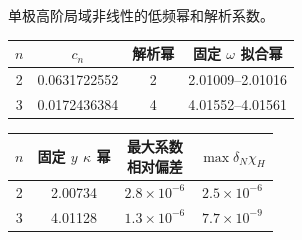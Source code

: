 \documentclass[UTF8,fontset=fandol,12pt,a4paper,oneside,openany]{ctexrep}
\begin{document}
\noindent\begin{minipage}{\linewidth}
\captionsetup{type=table}\caption{单极高阶局域非线性的低频幂和解析系数。}\label{audit:tab:power-l0}
\centering\fontsize{10.5}{14}\selectfont
\setlength{\tabcolsep}{6pt}\renewcommand{\arraystretch}{1.2}
\par{}\par\smallskip
\begin{tabular}{cccc}\toprule
$n$ & $c_n$ & 解析幂 & \shortstack{固定 $\omega$\\拟合幂}\\\midrule
2 & 0.0631722552 & 2 & 2.01009--2.01016\\
3 & 0.0172436384 & 4 & 4.01552--4.01561\\
\bottomrule\end{tabular}
\par\medskip
\par{}\par\smallskip
\begin{tabular}{cccc}\toprule
$n$ & \shortstack{固定 $y$\\$\kappa$ 幂} & \shortstack{最大系数\\相对偏差} & $\max\delta_N\chi_H$\\\midrule
2 & 2.00734 & $2.8\times10^{-6}$ & $2.5\times10^{-6}$\\
3 & 4.01128 & $1.3\times10^{-6}$ & $7.7\times10^{-9}$\\
\bottomrule\end{tabular}
\end{minipage}\par\addvspace{10pt}
\par\addvspace{14pt}
\end{document}
